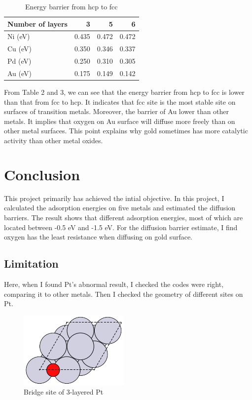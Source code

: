 \documentclass[11pt]{article}
\begin{document}
\begin{table}[H]
\caption{Energy barrier from hcp to fcc}
\begin{center}
\begin{tabular}{lrrr}
 Number of layers  &      3  &      5  &      6  \\
\hline
 Ni (eV)           &  0.435  &  0.472  &  0.472  \\
 Cu (eV)           &  0.350  &  0.346  &  0.337  \\
 Pd (eV)           &  0.250  &  0.310  &  0.305  \\
 Au (eV)           &  0.175  &  0.149  &  0.142  \\
\end{tabular}
\end{center}
\end{table}



From Table 2 and 3, we can see that the energy barrier from hcp to fcc is lower than that from fcc to hcp. It indicates that fcc site is the most stable site on surfaces of transition metals. Moreover, the barrier of Au lower than other metals. It implies that oxygen on Au surface will diffuse more freely than on other metal surfaces. This point explains why gold sometimes has more catalytic activity than other metal oxides.
\section{Conclusion}
\label{sec-5}

This project primarily has achieved the intial objective. In this project, I calculated the adsorption energies on five metals and estimated the diffusion barriers. The result shows that different adsorption energies, most of which are located  between -0.5 eV and -1.5 eV. For the diffusion barrier estimate, I find oxygen has the least resistance when diffusing on gold surface.
\subsection{Limitation}
\label{sec-5-1}

Here, when I found Pt's abnormal result, I checked the codes were right, comparing it to other metals. Then I checked the geometry of different sites on Pt.

\begin{figure}[H]
\centering
\includegraphics[width=203bp,]{./images/geometry/Pt-O-bridge-3.png}
\caption{Bridge site of 3-layered Pt}
\end{figure}
\end{document}
